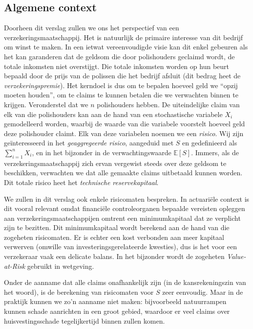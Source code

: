\documentclass{article}
\begin{document}
\subsection*{Algemene context}
Doorheen dit verslag zullen we ons het perspectief van een verzekeringsmaatschappij. Het is natuurlijk de primaire interesse van dit bedrijf om winst te maken. In een ietwat vereenvoudigde visie kan dit enkel gebeuren als het kan garanderen dat de geldsom die door polishouders geclaimd wordt, de totale inkomsten niet overstijgt. Die totale inkomsten worden op hun beurt bepaald door de prijs van de polissen die het bedrijf afsluit (dit bedrag heet de \textit{verzekeringspremie}). Het kerndoel is dus om te bepalen hoeveel geld we ``opzij moeten houden'', om te claims te kunnen betalen die we verwachten binnen te krijgen. Veronderstel dat we $n$ polishouders hebben. De uiteindelijke claim van elk van die polishouders kan aan de hand van een stochastische variabele $X_i$ gemodelleerd worden, waarbij de waarde van die variabele voorstelt hoeveel geld deze polishouder claimt. Elk van deze variabelen noemen we een \textit{risico}. Wij zijn geïnteresseerd in het \textit{geaggregeerde risico}, aangeduid met $S$ en gedefinieerd als $\sum_{i=1}^n X_i$, en in het bijzonder in de verwachtingswaarde $\mathbb{E}[S]$. Immers, als de verzekeringsmaatschappij zich ervan vergewist steeds over deze geldsom te beschikken, verwachten we dat alle gemaakte claims uitbetaald kunnen worden. Dit totale risico heet het \textit{technische reservekapitaal}. 

We zullen in dit verslag ook enkele risicomaten bespreken. In actuariële context is dit vooral relevant omdat financiële controleorganen bepaalde vereisten opleggen aan verzekeringsmaatschappijen omtrent een minimumkapitaal dat ze verplicht zijn te bezitten. Dit minimumkapitaal wordt berekend aan de hand van die zogeheten risicomaten. Er is echter een kost verbonden aan meer kapitaal verwerven (omwille van investeringsgerelateerde kwesties), dus is het voor een verzekeraar vaak een delicate balans. In het bijzonder wordt de zogeheten \textit{Value-at-Risk} gebruikt in wetgeving.

Onder de aanname dat alle claims onafhankelijk zijn (in de kansrekeningszin van het woord), is de berekening van risicomaten voor $S$ zeer eenvoudig. Maar in de praktijk kunnen we zo'n aanname niet maken: bijvoorbeeld natuurrampen kunnen schade aanrichten in een groot gebied, waardoor er veel claims over huisvestingsschade tegelijkertijd binnen zullen komen.
\end{document}
